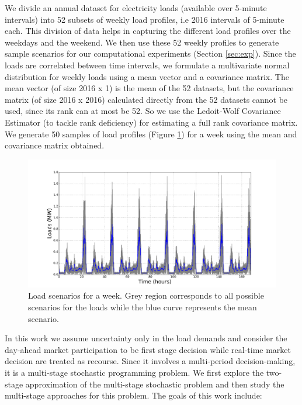 \documentclass[11pt,twoside]{article}
\begin{document}
We divide an annual dataset for electricity loads (available over 5-minute intervals) into 52 subsets of weekly load profiles, i.e 2016 intervals of 5-minute each. This division of data helps in capturing the different load profiles over the weekdays and the weekend. We then use these 52 weekly profiles to generate sample scenarios for our computational experiments (Section \ref{sec:exp}). Since the loads are correlated between time intervals, we formulate a multivariate normal distribution for weekly loads using a mean vector and a covariance matrix. The mean vector (of size 2016 x 1) is the mean of the 52 datasets, but the covariance matrix (of size 2016 x 2016) calculated directly from the 52 datasets cannot be used, since its rank can at most be 52. So we use the Ledoit-Wolf Covariance Estimator \cite{ledoit2004well} (to tackle rank deficiency) for estimating a full rank covariance matrix. We generate 50 samples of load profiles (Figure \ref{fig:loads_scenarios}) for a week using the mean and covariance matrix obtained. 
\begin{figure}[h!]
\begin{center}
\includegraphics[width=5in]{Figures/Plots/fullproblem_stoch/loads_scenarios.pdf} \caption{Load scenarios for a week. Grey region corresponds to all possible scenarios for the loads while the blue curve represents the mean scenario.}\label{fig:loads_scenarios}\end{center}
\end{figure}
\FloatBarrier
In this work we assume uncertainty only in the load demands and consider the day-ahead market participation to be first stage decision while real-time market decision are treated as recourse. Since it involves a multi-period decision-making, it is a multi-stage stochastic programming problem. We first explore the two-stage approximation of the multi-stage stochastic problem and then study the multi-stage approaches for this problem. The goals of this work include:
\end{document}
